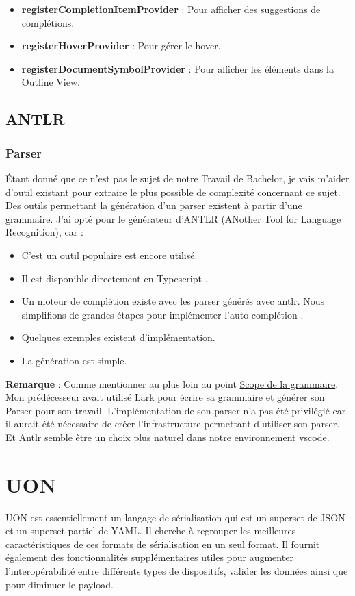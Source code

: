 \documentclass[
    iict, %
    il, %
]{heig-tb}
\begin{document}
\begin{itemize}
    \item \textbf{registerCompletionItemProvider} : Pour afficher des suggestions de complétions.
    \item \textbf{registerHoverProvider} : Pour gérer le hover.
    \item \textbf{registerDocumentSymbolProvider} : Pour afficher les éléments dans la Outline View.
\end{itemize}

\subsection{ANTLR}
\subsubsection{Parser}
Étant donné que ce n'est pas le sujet de notre Travail de Bachelor, je vais m'aider d'outil existant pour extraire le plus possible de complexité concernant ce sujet.
Des outils permettant la génération d'un parser existent à partir d'une grammaire. J'ai opté pour le générateur d'ANTLR (ANother Tool for Language Recognition), car :

\begin{itemize}
    \item C'est un outil populaire est encore utilisé.
    \item Il est disponible directement en Typescript \cite{antlr4ts}.
    \item Un moteur de complétion existe avec les parser générés avec antlr. Nous simplifions de grandes étapes pour implémenter l'auto-complétion \cite{antlr4-c3}.
    \item Quelques exemples existent d'implémentation.
    \item La génération est simple.
\end{itemize}

\textbf{Remarque} :
Comme mentionner au plus loin au point \hyperref[grammar scope]{Scope de la grammaire}. Mon prédécesseur avait utilisé Lark pour écrire sa grammaire et générer son Parser pour son travail.
L'implémentation de son parser n'a pas été privilégié car il aurait été nécessaire de créer l'infrastructure permettant d'utiliser son parser.
Et Antlr semble être un choix plus naturel dans notre environnement vscode.

\section{UON}
UON est essentiellement un langage de sérialisation qui est un superset de JSON et un superset partiel de YAML.
Il cherche à regrouper les meilleures caractéristiques de ces formats de sérialisation en un seul format.
Il fournit également des fonctionnalités supplémentaires utiles pour augmenter l'interopérabilité entre différents types de dispositifs, valider les données ainsi que pour diminuer le payload.
\end{document}
